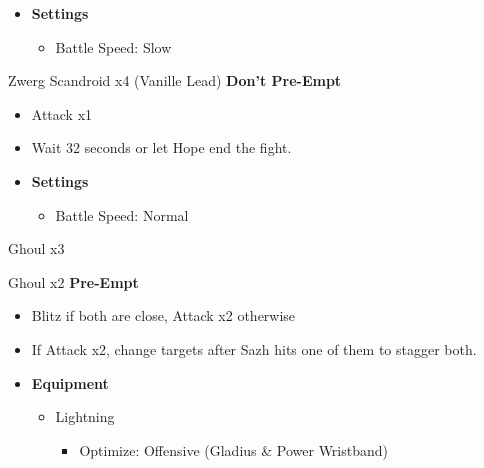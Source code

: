 \begin{menu}
\begin{itemize}
    \item \textbf{Settings}
    \begin{itemize}
        \item Battle Speed: Slow
    \end{itemize}
\end{itemize}
\end{menu}

\begin{battle}{Zwerg Scandroid x4 (Vanille Lead) \textbf{Don't Pre-Empt}}
\begin{itemize}
    \item Attack x1
    \item Wait 32 seconds or let Hope end the fight.
\end{itemize}
\end{battle}


\begin{menu}
\begin{itemize}
    \item \textbf{Settings}
    \begin{itemize}
        \item Battle Speed: Normal
    \end{itemize}
\end{itemize}
\end{menu}

\begin{battle}{Ghoul x3}
\end{battle}

\begin{battle}{Ghoul x2 \textbf{Pre-Empt}}
\begin{itemize}
    \item Blitz if both are close, Attack x2 otherwise
    \item If Attack x2, change targets after Sazh hits one of them to stagger both.
\end{itemize}
\end{battle}


\begin{menu}
\begin{itemize}
    \item \textbf{Equipment}
    \begin{itemize}
        \item Lightning
        \begin{itemize}
            \item Optimize: Offensive (Gladius \& Power Wristband)
        \end{itemize}
    \end{itemize}
\end{itemize}
\end{menu}

